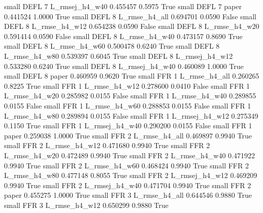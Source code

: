      small     DEFL                 7 L_rmsej_h4_w40   0.455457      0.5975    True
     small     DEFL                 7          paper   0.441524      1.0000    True
     small     DEFL                 8  L_rmse_h4_all   0.694701      0.0590   False
     small     DEFL                 8  L_rmse_h4_w12   0.654238      0.0590   False
     small     DEFL                 8  L_rmse_h4_w20   0.591414      0.0590   False
     small     DEFL                 8  L_rmse_h4_w40   0.473157      0.8690    True
     small     DEFL                 8  L_rmse_h4_w60   0.500478      0.6240    True
     small     DEFL                 8  L_rmse_h4_w80   0.539397      0.6045    True
     small     DEFL                 8 L_rmsej_h4_w12   0.533280      0.6240    True
     small     DEFL                 8 L_rmsej_h4_w40   0.460089      1.0000    True
     small     DEFL                 8          paper   0.460959      0.9620    True
     small      FFR                 1  L_rmse_h4_all   0.260265      0.8225    True
     small      FFR                 1  L_rmse_h4_w12   0.278600      0.0410   False
     small      FFR                 1  L_rmse_h4_w20   0.285982      0.0155   False
     small      FFR                 1  L_rmse_h4_w40   0.289855      0.0155   False
     small      FFR                 1  L_rmse_h4_w60   0.288853      0.0155   False
     small      FFR                 1  L_rmse_h4_w80   0.289894      0.0155   False
     small      FFR                 1 L_rmsej_h4_w12   0.275349      0.1150    True
     small      FFR                 1 L_rmsej_h4_w40   0.290200      0.0155   False
     small      FFR                 1          paper   0.259038      1.0000    True
     small      FFR                 2  L_rmse_h4_all   0.469897      0.9940    True
     small      FFR                 2  L_rmse_h4_w12   0.471680      0.9940    True
     small      FFR                 2  L_rmse_h4_w20   0.472489      0.9940    True
     small      FFR                 2  L_rmse_h4_w40   0.471922      0.9940    True
     small      FFR                 2  L_rmse_h4_w60   0.468424      0.9940    True
     small      FFR                 2  L_rmse_h4_w80   0.477148      0.8055    True
     small      FFR                 2 L_rmsej_h4_w12   0.469209      0.9940    True
     small      FFR                 2 L_rmsej_h4_w40   0.471704      0.9940    True
     small      FFR                 2          paper   0.455275      1.0000    True
     small      FFR                 3  L_rmse_h4_all   0.644546      0.9880    True
     small      FFR                 3  L_rmse_h4_w12   0.650299      0.9880    True
